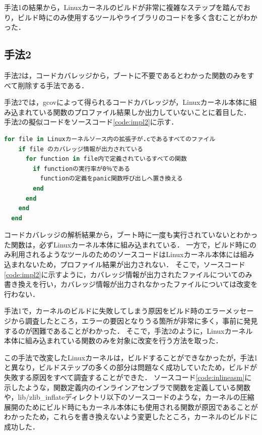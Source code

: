 \documentclass[graduation-thesis]{mlarticle}
\begin{document}
手法1の結果から，Linuxカーネルのビルドが非常に複雑なステップを踏んでおり，ビルド時にのみ使用するツールやライブラリのコードを多く含むことがわかった．

\subsection{手法2}
\label{implementation:2}
手法2は，コードカバレッジから，ブートに不要であるとわかった関数のみをすべて削除する手法である．

手法2では，gcovによって得られるコードカバレッジが，Linuxカーネル本体に組み込まれている関数のプロファイル結果しか出力していないことに着目した．
手法2の擬似コードをソースコード\ref{code:impl2}に示す．

\begin{lstlisting}[language=ruby, caption=手法2の擬似コード, label=code:impl2]
  for file in Linuxカーネルソース内の拡張子が.cであるすべてのファイル
    if file のカバレッジ情報が出力されている
      for function in file内で定義されているすべての関数
        if functionの実行率が0％である
          functionの定義をpanic関数呼び出しへ置き換える
        end
      end
    end
  end
\end{lstlisting}

コードカバレッジの解析結果から，ブート時に一度も実行されていないとわかった関数は，必ずLinuxカーネル本体に組み込まれている．
一方で，ビルド時にのみ利用されるようなツールのためのソースコードはLinuxカーネル本体には組み込まれないため，プロファイル結果が出力されない．
そこで，ソースコード\ref{code:impl2}に示すように，カバレッジ情報が出力されたファイルについてのみ書き換えを行い，カバレッジ情報が出力されなかったファイルについては改変を行わない．

手法1で，カーネルのビルドに失敗してしまう原因をビルド時のエラーメッセージから調査したところ，エラーの要因となりうる箇所が非常に多く，事前に発見するのが困難であることがわかった．
そこで，手法2のように，Linuxカーネル本体に組み込まれている関数のみを対象に改変を行う方法を取った．

この手法で改変したLinuxカーネルは，ビルドすることができなかったが，手法1と異なり，ビルドステップの多くの部分は問題なく成功していたため，ビルドが失敗する原因をすべて調査することができた．
ソースコード\ref{code:inlineasm}に示したような，関数定義内のインラインアセンブラで関数を定義している関数や，lib/zlib\_inflateディレクトリ以下のソースコードのような，カーネルの圧縮展開のためにビルド時にもカーネル本体にも使用される関数が原因であることがわかったため，これらを書き換えないよう変更したところ，カーネルのビルドに成功した．
\end{document}
